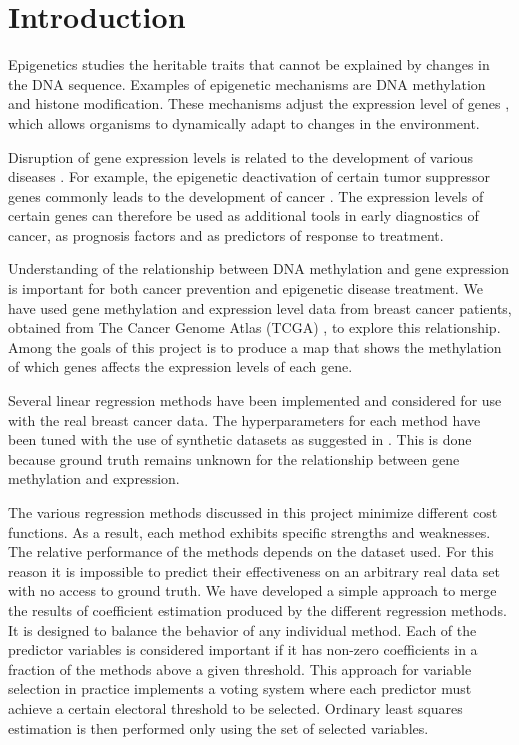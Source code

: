 \chapter{Introduction}
\setcounter{page}{1}
Epigenetics \cite{holliday2006epigenetics} studies the heritable traits that cannot be explained by changes in the DNA sequence. Examples of epigenetic mechanisms are DNA methylation and histone modification. These mechanisms adjust the expression level of genes \cite{jaenisch2003epigenetic}, which allows organisms to dynamically adapt to changes in the environment.

Disruption of gene expression levels is related to the development of various diseases \cite{egger2004epigenetics}. For example, the epigenetic deactivation of certain tumor suppressor genes commonly leads to the development of cancer \cite{esteller2008epigenetics}. The expression levels of certain genes can therefore be used as additional tools in early diagnostics of cancer, as prognosis factors and as predictors of response to treatment.

Understanding of the relationship between DNA methylation and gene expression is important for both cancer prevention and epigenetic disease treatment. We have used gene methylation and expression level data from breast cancer patients, obtained from The Cancer Genome Atlas (TCGA) \cite{cancer2012comprehensive}, to explore this relationship. Among the goals of this project is to produce a map that shows the methylation of which genes affects the expression levels of each gene.

Several linear regression methods \cite{tibshirani1996regression,zou2005regularization,li2008network,li2010variable,pan2010incorporating,luo2012two,kim2013network} have been implemented and considered for use with the real breast cancer data. The hyperparameters for each method have been tuned with the use of synthetic datasets as suggested in \cite{li2008network}. This is done because ground truth remains unknown for the relationship between gene methylation and expression.

The various regression methods discussed in this project minimize different cost functions. As a result, each method exhibits specific strengths and weaknesses. The relative performance of the methods depends on the dataset used. For this reason it is impossible to predict their effectiveness on an arbitrary real data set with no access to ground truth. We have developed a simple approach to merge the results of coefficient estimation produced by the different regression methods. It is designed to balance the behavior of any individual method. Each of the predictor variables is considered important if it has non-zero coefficients in a fraction of the methods above a given threshold. This approach for variable selection in practice implements a voting system where each predictor must achieve a certain electoral threshold to be selected. Ordinary least squares estimation is then performed only using the set of selected variables.

